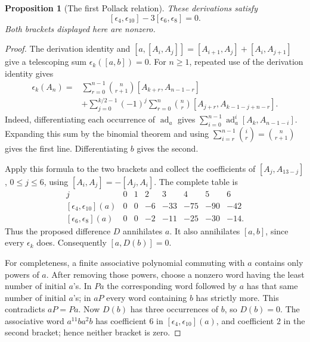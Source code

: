 \documentclass[11pt]{article}
\newtheorem{proposition}[theorem]{Proposition}
\theoremstyle{definition}\newtheorem{definition}[theorem]{Definition}
\begin{document}
\begin{proposition}[The first Pollack relation]\label{prop:pollack-explicit}
These derivations satisfy
\[
 [\epsilon_4,\epsilon_{10}]-3[\epsilon_6,\epsilon_8]=0.
\]
Both brackets displayed here are nonzero.
\end{proposition}
\begin{proof}
The derivation identity and
\([a,[A_i,A_j]]=[A_{i+1},A_j]+[A_i,A_{j+1}]\)
give a telescoping sum
\(\epsilon_k([a,b])=0\).
For \(n\geq1\), repeated use of the derivation identity gives
\begin{align*}
 \epsilon_k(A_n)
 ={}&\sum_{r=0}^{n-1}\binom{n}{r+1}
              [A_{k+r},A_{n-1-r}]\\
 &+\sum_{j=0}^{k/2-1}(-1)^j
      \sum_{r=0}^{n}\binom nr
              [A_{j+r},A_{k-1-j+n-r}].
\end{align*}
Indeed, differentiating each occurrence of
\(\operatorname{ad}_a\) gives
\(\sum_{i=0}^{n-1}\operatorname{ad}_a^i
[A_k,A_{n-1-i}]\). Expanding this sum by the binomial theorem
and using
\(\sum_{i=r}^{n-1}\binom ir=\binom n{r+1}\)
gives the first line. Differentiating \(b\) gives the second.

Apply this formula to the two brackets and collect the coefficients
of \([A_j,A_{13-j}]\), \(0\leq j\leq6\), using
\([A_i,A_j]=-[A_j,A_i]\). The complete table is
\[
\begin{array}{c|rrrrrrr}
j&0&1&2&3&4&5&6\\ \hline
[\epsilon_4,\epsilon_{10}](a)&0&0&-6&-33&-75&-90&-42\\
{}[\epsilon_6,\epsilon_8](a)&0&0&-2&-11&-25&-30&-14 .
\end{array}
\]
Thus the proposed difference \(D\) annihilates \(a\).
It also annihilates \([a,b]\), since every \(\epsilon_k\) does.
Consequently \([a,D(b)]=0\).

For completeness, a finite associative polynomial commuting with
\(a\) contains only powers of \(a\). After removing those powers,
choose a nonzero word having the least number of initial \(a\)'s.
In \(Pa\) the corresponding word followed by \(a\) has that same
number of initial \(a\)'s; in \(aP\) every word containing \(b\)
has strictly more. This contradicts \(aP=Pa\).
Now \(D(b)\) has three occurrences of \(b\), so \(D(b)=0\).
The associative word \(a^{11}ba^2b\) has coefficient \(6\) in
\([\epsilon_4,\epsilon_{10}](a)\), and coefficient \(2\) in the
second bracket; hence neither bracket is zero.
\end{proof}
\end{document}
